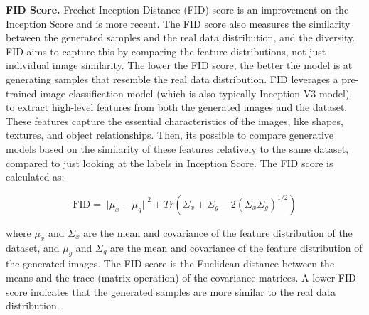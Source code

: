 \textbf{FID Score.} Frechet Inception Distance (FID) score \cite{fid_score} is an improvement on the Inception Score and is more recent. The FID score also measures the similarity between the generated samples and the real data distribution, and the diversity. FID aims to capture this by comparing the feature distributions, not just individual image similarity. The lower the FID score, the better the model is at generating samples that resemble the real data distribution. FID leverages a pre-trained image classification model (which is also typically Inception V3 model), to extract high-level features from both the generated images and the dataset. These features capture the essential characteristics of the images, like shapes, textures, and object relationships. Then, its possible to compare generative models based on the similarity of these features relatively to the same dataset, compared to just looking at the labels in Inception Score. The FID score is calculated as:

\begin{equation}
    \text{FID} = ||\mu_x - \mu_g||^2 + Tr(\Sigma_x + \Sigma_g - 2(\Sigma_x\Sigma_g)^{1/2})
    \label{eq:fid_score}
\end{equation}

where $\mu_x$ and $\Sigma_x$ are the mean and covariance of the feature distribution of the dataset, and $\mu_g$ and $\Sigma_g$ are the mean and covariance of the feature distribution of the generated images. The FID score is the Euclidean distance between the means and the trace (matrix operation) of the covariance matrices. A lower FID score indicates that the generated samples are more similar to the real data distribution.

